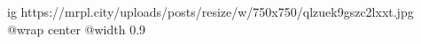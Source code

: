  
 
 
 
 

\ifcmt
  ig https://mrpl.city/uploads/posts/resize/w/750x750/qlzuek9gszc2lxxt.jpg
  @wrap center
  @width 0.9
\fi

